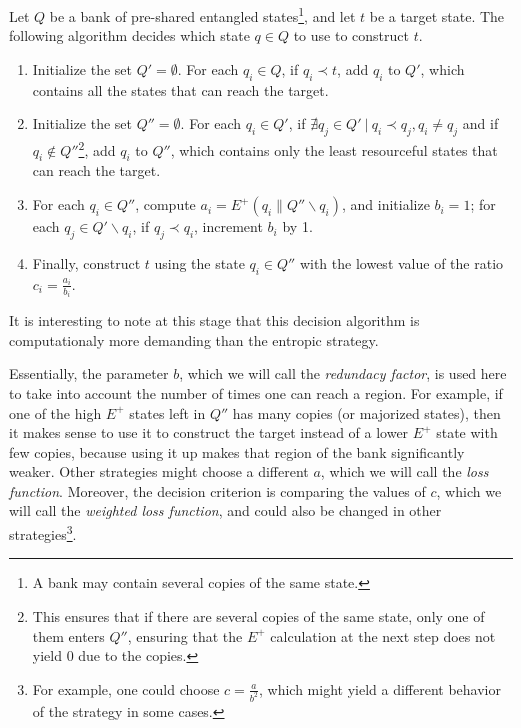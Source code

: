 \begin{definition} \label{strat:unique_entropy}
    Let $Q$ be a bank of pre-shared entangled states\footnote{A bank may contain several copies of the same state.}, and let $t$ be a target state. The following algorithm decides which state $q \in Q$ to use to construct $t$.
    \begin{enumerate}
        \item Initialize the set $Q' = \emptyset$. For each $q_i \in Q$, if $q_i \prec t$, add $q_i$ to $Q'$, which contains all the states that can reach the target.
        \item Initialize the set $Q'' = \emptyset$. For each $q_i \in Q'$, if $\nexists q_j \in Q' \: | \: q_i \prec q_j, q_i \neq q_j$ and if $q_i \notin Q''$\footnote{This ensures that if there are several copies of the same state, only one of them enters $Q''$, ensuring that the $E^+$ calculation at the next step does not yield 0 due to the copies.}, add $q_i$ to $Q''$, which contains only the least resourceful states that can reach the target.
        \item For each $q_i \in Q''$, compute $a_i = E^+(q_i \parallel Q'' \backslash q_i)$, and initialize $b_i = 1$; for each $q_j \in Q' \backslash q_i$, if $q_j \prec q_i$, increment $b_i$ by 1. \label{step:volume}
        \item Finally, construct $t$ using the state $q_i \in Q''$ with the lowest value of the ratio $c_i = \frac{a_i}{b_i}$.
    \end{enumerate}
\end{definition}

\noindent It is interesting to note at this stage that this decision algorithm is computationaly more demanding than the entropic strategy.

Essentially, the parameter $b$, which we will call the \textit{redundacy factor}, is used here to take into account the number of times one can reach a region. For example, if one of the high $E^+$ states left in $Q''$ has many copies (or majorized states), then it makes sense to use it to construct the target instead of a lower $E^+$ state with few copies, because using it up makes that region of the bank significantly weaker. Other strategies might choose a different $a$, which we will call the \textit{loss function}. Moreover, the decision criterion is comparing the values of $c$, which we will call the \textit{weighted loss function}, and could also be changed in other strategies\footnote{For example, one could choose $c = \frac{a}{b^2}$, which might yield a different behavior of the strategy in some cases.}.%


